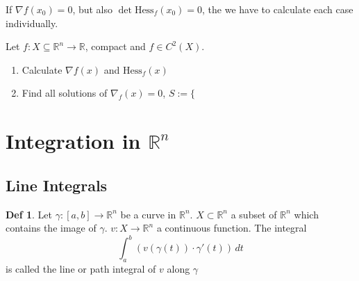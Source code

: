 \documentclass[a4paper, 10pt]{article}
\theoremstyle{definition}
\newtheorem*{definition}{Def}
\newcommand{\R}{\mathbb{R}}
\newcommand{\Hess}{\text{Hess}}
\begin{document}

\begin{note*}
    If \(\nabla f(x_0) = 0\), but also \(\det \Hess_f(x_0) = 0\), the we have to calculate each case individually.
\end{note*}

\begin{note*}
    Let \(f: X \subseteq \R^n \to \R\), compact and \(f \in C^2(X)\).
    \begin{enumerate}
        \item Calculate \(\nabla f(x)\) and \(\Hess_f(x)\)
        \item Find all solutions of \(\nabla_f(x) = 0\), \(S := \{\)
    \end{enumerate}
\end{note*}

\section*{Integration in \(\R^n\)}
\subsection*{Line Integrals}

\begin{definition}
    Let \(\gamma: [a, b] \to \R^n\) be a curve in \(\R^n\). \(X \subset \R^n\) a subset of \(\R^n\) which contains the image of \(\gamma\). \(v: X \to \R^n\) a continuous function. The integral
    \[\int_a^b (v(\gamma(t)) \cdot \gamma'(t)) \, dt\]
    is called the line or path integral of \(v\) along \(\gamma\)
\end{definition}
\end{document}
